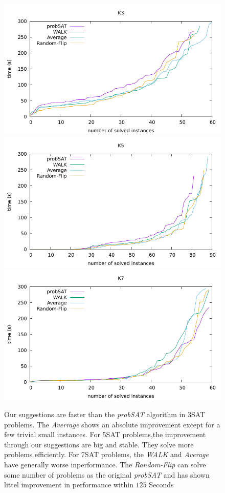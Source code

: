 \documentclass[12pt,a4paper,twoside]{scrartcl}
\numberwithin{equation}{section}
\begin{document}
\clearpage
\begin{figure}[H]
\begin{center}
  \includegraphics[scale = 0.8]{DATA/K3/e2.pdf}
    \includegraphics[scale = 0.8]{DATA/K5/e2.pdf}
      \includegraphics[scale = 0.8]{DATA/K7/e2.pdf}

  \end{center}
  \caption{Our suggestions are faster than the \emph{probSAT} algorithm in 3SAT problems. The \emph{Averrage} shows an absolute improvement except for a few trivial small instances. For 5SAT problems,the improvement through our suggestions are big and stable. They solve more problems efficiently. For 7SAT problems, the \emph{WALK} and \emph{Average} have generally worse inperformance. The \emph{Random-Flip} can solve some number of problems as the original \emph{probSAT} and has shown littel improvement in performance within $125$ Seconds}

  \label{Experiment 2 cactus plot}
  \end{figure}
\clearpage
\end{document}
